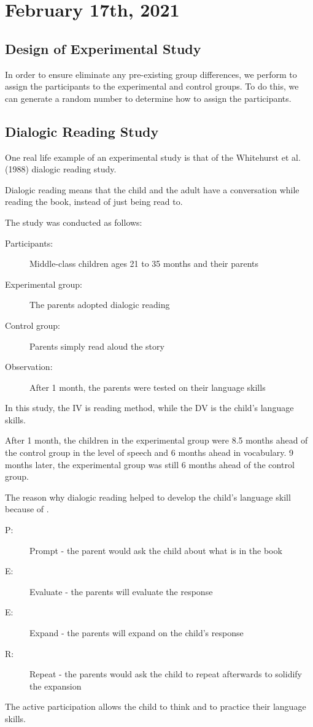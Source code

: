 \documentclass[../main/main.tex]{subfiles}
\begin{document}
\section{February 17th, 2021}
\subsection{Design of Experimental Study}
In order to ensure eliminate any pre-existing group differences, we perform  to assign the participants to the experimental and control groups.  To do this, we can generate a random number to determine how to assign the participants.

\subsection{Dialogic Reading Study}
One real life example of an experimental study is that of the Whitehurst et al. (1988) dialogic reading study.
\begin{remark}
Dialogic reading means that the child and the adult have a conversation while reading the book, instead of just being read to.
\end{remark}
The study was conducted as follows:
\begin{description}
  \item[Participants:] Middle-class children ages 21 to 35 months and their parents
  \item[Experimental group:] The parents adopted dialogic reading
        \item[Control group:] Parents simply read aloud the story
        \item[Observation:] After 1 month, the parents were tested on their language skills
\end{description}
In this study, the IV is reading method, while the DV is the child's language skills.

\begin{remark}
After 1 month, the children in the experimental group were 8.5 months ahead of the control group in the level of speech and 6 months ahead in vocabulary. 9 months later, the experimental group was still 6 months ahead of the control group.
\end{remark}
  The reason why dialogic reading helped to develop the child's language skill because of .
  \begin{description}
	\item[P:] Prompt - the parent would ask the child about what is in the book
	\item[E:] Evaluate - the parents will evaluate the response
	\item[E:] Expand - the parents will expand on the child's response
	\item[R:] Repeat - the parents would ask the child to repeat afterwards to solidify the expansion
  \end{description}
The active participation allows the child to think and to practice their language skills.
\end{document}
